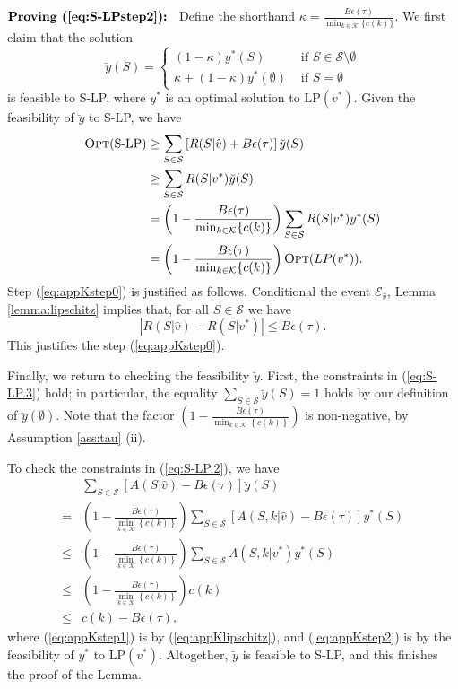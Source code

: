 \documentclass{article}
\theoremstyle{definition}
\newcommand{\KKK}{\mathcal{K}}
\newcommand{\SSS}{\mathcal{S}}
\begin{document}
$\textbf{Proving (\ref{eq:S-LPstep2}): }$ Define the shorthand $\kappa = \frac{B\epsilon(\tau)}{\min_{k\in \KKK}\{c(k)\}}$. We first claim that the solution 
\[\breve{y}(S) = \left\{
  \begin{array}{lr}
    \left(1 - \kappa\right)y^*(S) &\text{ if } S\in \SSS\setminus \emptyset\\
     \kappa + \left(1 - \kappa\right)y^*(\emptyset)&\text{ if } S= \emptyset
  \end{array}
\right.
\]
is feasible to S-LP, where $y^*$ is an optimal solution to LP$(v^*)$. Given the feasibility of $\breve{y}$ to S-LP, we have
\begin{align}
\text{{\sc Opt}(S-LP)}&\geq \sum_{S\in \SSS} \left[R(S|\hat{v}) + B\epsilon(\tau)\right]\breve{y}(S)\nonumber\\
&\geq \sum_{S\in \SSS} R(S|v^*)\breve{y}(S) \label{eq:appKstep0}\\
&= \left(1 - \frac{B\epsilon(\tau)}{\min_{k\in \KKK}\{c(k)\}}\right)\sum_{S\in \SSS} R(S|v^*)y^*(S) \nonumber\\
&= \left(1 - \frac{B\epsilon(\tau)}{\min_{k\in \KKK}\{c(k)\}}\right)\text{{\sc Opt}}(LP(v^*))\nonumber.
\end{align}
Step (\ref{eq:appKstep0}) is justified as follows. Conditional the event $\mathcal{E}_{\hat{v}}$, Lemma \ref{lemma:lipschitz} implies that, for all $S\in \SSS$ we have 
\begin{equation}\label{eq:appKlipschitz}
\left|R(S|\hat{v}) - R(S|v^*)\right|\leq B\epsilon(\tau).
\end{equation}
This justifies the step (\ref{eq:appKstep0}).

Finally, we return to checking the feasibility $\breve{y}$. First, the constraints in (\ref{eq:S-LP.3}) hold; in particular, the equality $\sum_{S\in \SSS}\breve{y}(S) = 1$ holds by our definition of $\breve{y}(\emptyset)$. Note that the factor $\left(1 - \frac{B\epsilon(\tau)}{\min_{k\in \KKK}\left\{c(k)\right\}}\right)$ is non-negative, by Assumption \ref{ass:tau} (ii).

To check the constraints in (\ref{eq:S-LP.2}), we have
\begin{align}
&\sum_{S\in \SSS} \left[A(S|\hat{v}) -B\epsilon(\tau)\right]\breve{y}(S)  \nonumber\\
= &\left(1 - \frac{B\epsilon(\tau)}{\min_{k\in \KKK}\left\{c(k)\right\}}\right)\sum_{S\in \SSS} \left[A(S, k | \hat{v}) - B\epsilon(\tau)\right]y^*(S)\nonumber\\
\leq &\left(1 - \frac{B\epsilon(\tau)}{\min_{k\in \KKK}\left\{c(k)\right\}}\right)\sum_{S\in \SSS} A(S, k|v^*)y^*(S)\label{eq:appKstep1}\\
\leq &\left(1 - \frac{B\epsilon(\tau)}{\min_{k\in \KKK}\left\{c(k)\right\}}\right)c(k) \label{eq:appKstep2}\\
\leq & c(k) - B\epsilon(\tau)\nonumber,
\end{align}
where (\ref{eq:appKstep1}) is by (\ref{eq:appKlipschitz}), and (\ref{eq:appKstep2}) is by the feasibility of $y^*$ to LP$(v^*)$. Altogether, $\breve{y}$ is feasible to S-LP, and this finishes the proof of the Lemma.
\end{document}

